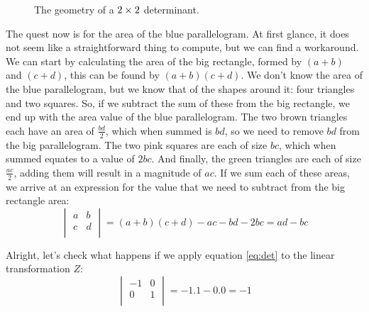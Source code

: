 \documentclass[600paper, 11pt,twoside,openany]{kdp}
\begin{document}
\begin{figure}[h!]
\begin{center}
\end{center}
\caption{The geometry of a $\protect2 \times 2$ determinant.}
\end{figure}
\par 
\vspace{-3pt}
\indent The quest now is for the area of the blue parallelogram. At first glance, it does not seem like a straightforward thing to compute, but we can find a workaround. We can start by calculating the area of the big rectangle, formed by $(a+b)$ and $(c+d)$, this can be found by $(a+b)(c+d)$. We don’t know the area of the blue parallelogram, but we know that of the shapes around it: four triangles and two squares. So, if we subtract the sum of these from the big rectangle, we end up with the area value of the blue parallelogram. The two brown triangles each have an area of $\frac{bd}{2}$, which when summed is $bd$, so we need to remove $bd$ from the big parallelogram. The two pink squares are each of size $bc$, which when summed equates to a value of $2bc$. And finally,  the green triangles are each of size $\frac{ac}{2}$, adding them will result in a magnitude of $ac$. If we sum each of these areas, we arrive at an expression for the value that we need to subtract from the big rectangle area:
\[\begin{vmatrix}
a & b   \\
c & d \\
\end{vmatrix} = (a+b)(c+d)-ac-bd-2bc = ad-bc
\]
\par 
\vspace{-3pt}
\indent Alright, let’s check what happens if we apply equation \ref{eq:det} to the linear transformation $Z$:
\begin{equation*}
\begin{vmatrix}
-1 & 0   \\
0 & 1 \\
\end{vmatrix} = -1.1 - 0.0 = -1
\end{equation*}
\end{document}
